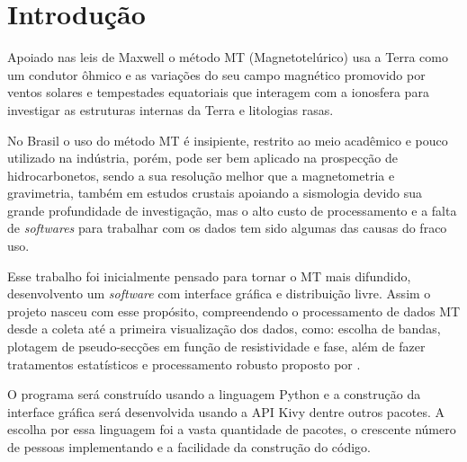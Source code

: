 

\chapter{Introdução}
    \label{cap-introducao}
    
	Apoiado nas leis de Maxwell o método MT (Magnetotelúrico) usa a Terra como 
	um condutor ôhmico e as variações do seu campo 
	magnético promovido por ventos solares \cite{parkinson93} e tempestades equatoriais 
	que interagem com a ionosfera para investigar as 
	estruturas internas da Terra e litologias rasas. 
	
	
	No Brasil o uso do método MT é insipiente, restrito ao meio acadêmico e pouco
	utilizado na indústria, porém, pode ser bem aplicado na prospecção de 
	hidrocarbonetos, sendo a sua resolução melhor que a magnetometria
	e gravimetria, também em estudos crustais
	apoiando a sismologia devido sua grande profundidade de investigação, mas o 
	alto custo de processamento e a falta de \textit{softwares} para trabalhar com os 
	dados tem sido algumas das causas do fraco uso.
	
	
	Esse trabalho foi inicialmente pensado para tornar o MT mais difundido, 
	desenvolvento um \textit{software} com interface gráfica e 
	distribuição livre. Assim o projeto nasceu 
	com esse propósito, compreendendo o processamento de dados
	MT desde a coleta até a primeira visualização dos dados, como: escolha 
	de bandas, plotagem de pseudo-secções em função de resistividade e fase, além de fazer tratamentos estatísticos e processamento robusto 
	proposto por \citeauthor{egbert97} \citeyearpar{egbert97}.
	
	
	O programa será construído usando a linguagem Python \cite{python36} 
	e a construção da interface gráfica será desenvolvida usando a API
	Kivy \cite{kivy110} dentre outros pacotes. A escolha por essa linguagem foi a vasta quantidade de pacotes,  o crescente 
	número de pessoas implementando e a facilidade da construção do código.



